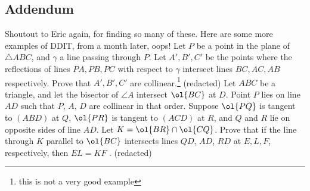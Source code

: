 \documentclass{seto}
\begin{document}
\subsection{Addendum}
Shoutout to Eric again, for finding so many of these. Here are some more examples of DDIT, from a month later, oops! 
\exercise[USAMO 2012/5] Let $P$ be a point in the plane of $\triangle ABC$, and $\gamma$ a line passing through $P$. Let $A', B', C'$ be the points where the reflections of lines $PA, PB, PC$ with respect to $\gamma$ intersect lines $BC, AC, AB$ respectively. Prove that $A', B', C'$ are collinear.\footnote{this is not a very good example}
(redacted)
\exercise[China 2020/2] Let $ABC$ be a triangle, and let the bisector of $\angle A$ intersect $\ol{BC}$ at $D$. Point $P$ lies on line $AD$ such that $P$, $A$, $D$ are collinear in that order. Suppose $\ol{PQ}$ is tangent to $(ABD)$ at $Q$, $\ol{PR}$ is tangent to $(ACD)$ at $R$, and $Q$ and $R$ lie on opposite sides of line $AD$. Let $K=\ol{BR}\cap\ol{CQ}$. Prove that if the line through $K$ parallel to $\ol{BC}$ intersects lines
$QD$, $AD$, $RD$ at $E, L, F $, respectively, then $EL = KF$ .
(redacted)
\end{document}
